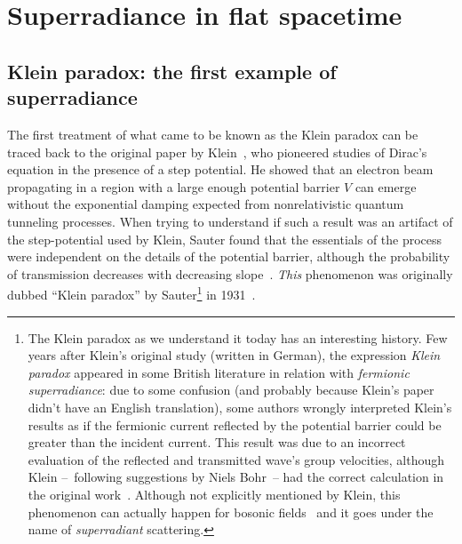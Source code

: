 \documentclass[11pt]{article}
\numberwithin{equation}{section} %
\begin{document}
\newpage



\clearpage
\newpage
\section{Superradiance in flat spacetime}\label{sec:faces}
\subsection{Klein paradox: the first example of superradiance} \label{sec:KleinParadox}
The first treatment of what came to be known as the Klein paradox can be traced back to the original paper by Klein~\cite{Kleinparadox}, who pioneered studies of Dirac's equation in the presence of a step potential. He showed that an electron beam propagating in a region with a large enough potential barrier $V$ can emerge without the exponential damping expected from nonrelativistic quantum tunneling processes. When trying to understand if such a result was an artifact of the step-potential used by Klein, Sauter found that the essentials of the process were independent on the details of the potential barrier, although the probability of transmission decreases with decreasing slope~\cite{Sauter:1931zz}. 
{\it This} phenomenon was originally dubbed ``Klein paradox'' by Sauter\footnote{The Klein paradox as we understand it today has an interesting history. Few years after Klein's original study (written in German), the expression {\it Klein paradox} appeared in some British literature in relation with \emph{fermionic superradiance}: due to some confusion (and probably because Klein's paper didn't have an English translation), some authors wrongly interpreted Klein's results as if the fermionic current reflected by the potential barrier could be greater than the incident current. This result was due to an incorrect evaluation of the reflected and transmitted wave's group velocities, although Klein --~following suggestions by Niels Bohr~-- had the correct calculation in the original work~\cite{Manogue1988}. Although not explicitly mentioned by Klein, this phenomenon can actually happen for bosonic fields~\cite{Winter:1959AJP} and it goes under the name of \emph{superradiant} scattering.} in 1931~\cite{Sauter:1931zz}.
\end{document}
